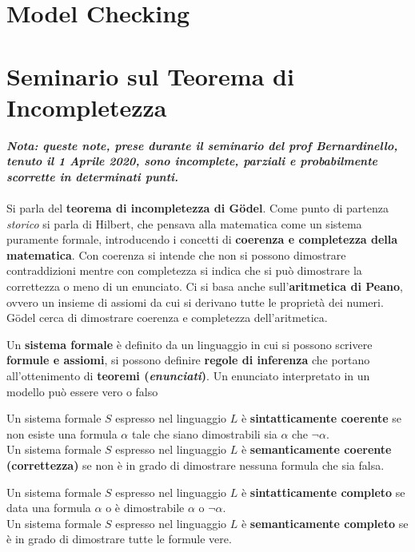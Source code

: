 \documentclass[a4paper,12pt, oneside]{book}
\begin{document}
\chapter{Model Checking}






\chapter{Seminario sul Teorema di Incompletezza}
\textit{\textbf{Nota: queste note, prese durante il seminario del prof
    Bernardinello, tenuto il 1 Aprile 2020, sono incomplete, parziali e
    probabilmente scorrette in determinati punti.}}\\\\
Si parla del \textbf{teorema di incompletezza di G\"{o}del}. Come punto di
partenza \textit{storico} si parla di Hilbert, che pensava alla matematica come
un sistema puramente formale, introducendo i concetti di \textbf{coerenza e
  completezza della matematica}. Con coerenza si intende che non si possono
dimostrare contraddizioni mentre con completezza si indica che si può dimostrare
la correttezza o meno di un enunciato. Ci si basa anche sull'\textbf{aritmetica
  di Peano}, ovvero un insieme di assiomi da cui si derivano tutte le proprietà
dei numeri. \\
G\"{o}del cerca di dimostrare coerenza e completezza dell'aritmetica.
\begin{definizione}
  Un \textbf{sistema formale} è definito da un linguaggio in cui si possono
  scrivere \textbf{formule e assiomi}, si possono definire \textbf{regole di
    inferenza} che portano all'ottenimento di \textbf{teoremi
    (\textit{enunciati})}. Un enunciato interpretato in un modello può essere
  vero o falso
\end{definizione}
\begin{definizione}
  Un sistema formale $S$ espresso nel linguaggio $L$ è \textbf{sintatticamente
    coerente} se non esiste una formula $\alpha$ tale che siano dimostrabili sia
  $\alpha$ che $\neg \alpha$.\\
  Un sistema formale $S$ espresso nel linguaggio $L$ è \textbf{semanticamente
    coerente (correttezza)} se non è in grado di dimostrare nessuna formula che
  sia falsa.
\end{definizione}
\begin{definizione}
  Un sistema formale $S$ espresso nel linguaggio $L$ è \textbf{sintatticamente
    completo} se data una formula $\alpha$ o è dimostrabile $\alpha$ o
  $\neg\alpha$.\\
  Un sistema formale $S$ espresso nel linguaggio $L$ è \textbf{semanticamente
    completo} se è in grado di dimostrare tutte le formule vere.
\end{definizione}
\end{document}
